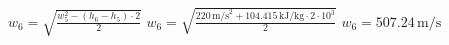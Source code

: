 \( w_6 = \sqrt{\frac{w_5^2 - (h_6 - h_5) \cdot 2}{2}} \)  
\( w_6 = \sqrt{\frac{220 \, \text{m/s}^2 + 104.415 \, \text{kJ/kg} \cdot 2 \cdot 10^3}{2}} \)  
\( w_6 = 507.24 \, \text{m/s} \)